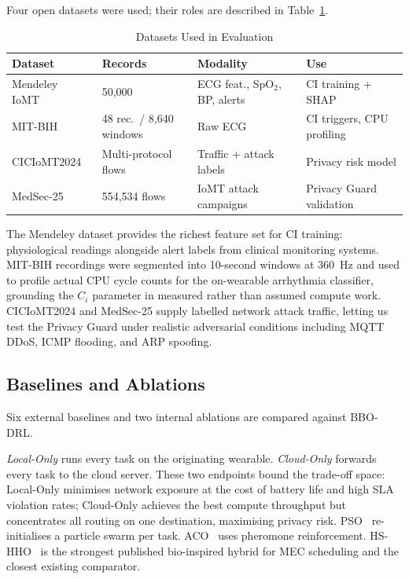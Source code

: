 \documentclass[journal]{IEEEtran}
\begin{document}
Four open datasets were used; their roles are described in
Table~\ref{tab:datasets}.

\begin{table}[t]
  \centering
  \caption{Datasets Used in Evaluation}
  \label{tab:datasets}
  \renewcommand{\arraystretch}{1.2}
  \begin{tabular}{p{1.6cm}p{1.4cm}p{1.8cm}p{2.2cm}}
    \toprule
    \textbf{Dataset} & \textbf{Records} & \textbf{Modality} & \textbf{Use} \\
    \midrule
    Mendeley IoMT~\cite{mendeley_iomt}
      & 50,000 & ECG feat., SpO$_2$, BP, alerts
      & CI training + SHAP \\[3pt]
    MIT-BIH~\cite{moody2001mitbih}
      & 48 rec.\ / 8,640 windows & Raw ECG
      & CI triggers, CPU profiling \\[3pt]
    CICIoMT2024~\cite{cic2024}
      & Multi-protocol flows & Traffic + attack labels
      & Privacy risk model \\[3pt]
    MedSec-25~\cite{medsec25}
      & 554,534 flows & IoMT attack campaigns
      & Privacy Guard validation \\
    \bottomrule
  \end{tabular}
\end{table}

The Mendeley dataset provides the richest feature set for CI training:
physiological readings alongside alert labels from clinical monitoring
systems. MIT-BIH recordings were segmented into 10-second windows at
360~Hz and used to profile actual CPU cycle counts for the on-wearable
arrhythmia classifier, grounding the $C_i$ parameter in measured
rather than assumed compute work. CICIoMT2024 and MedSec-25 supply
labelled network attack traffic, letting us test the Privacy Guard
under realistic adversarial conditions including MQTT DDoS, ICMP
flooding, and ARP spoofing.

\subsection{Baselines and Ablations}
\label{subsec:baselines}

Six external baselines and two internal ablations are compared against
BBO-DRL.

\textit{Local-Only} runs every task on the originating wearable.
\textit{Cloud-Only} forwards every task to the cloud server. These two
endpoints bound the trade-off space: Local-Only minimises network
exposure at the cost of battery life and high SLA violation rates;
Cloud-Only achieves the best compute throughput but concentrates all
routing on one destination, maximising privacy risk. PSO~\cite{kennedy1995pso}
re-initialises a particle swarm per task. ACO~\cite{dorigo2004aco}
uses pheromone reinforcement. HS-HHO~\cite{liu2023hshho} is the
strongest published bio-inspired hybrid for MEC scheduling and the
closest existing comparator.
\end{document}
